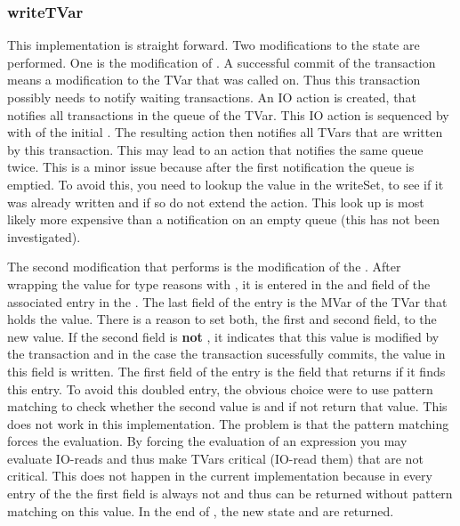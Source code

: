 \subsubsection{writeTVar}
This implementation is straight forward. Two modifications to the state are performed. One is
the modification of . A successful commit of the transaction means a 
modification to the TVar that  was called on. Thus this transaction 
possibly needs to notify waiting transactions. An IO action is created, that notifies
all transactions in the queue of the TVar. This IO action is sequenced by \code{>>} with 
 of the initial . The resulting action then notifies all
TVars that are written by this transaction. This may lead to an action that notifies the 
same queue twice. This is a minor issue because after the first notification the queue 
is emptied. To avoid this, you need to lookup the value in the writeSet, to see if 
it was already written and if so do not extend the  action. This look up
is most likely more expensive than a notification on an empty queue (this has not been 
investigated). 

The second modification that  performs is the modification of the .
After wrapping the value for type reasons with , it is entered in the  and  
field of the associated entry in the . The last field of the entry is the MVar of
the TVar that holds the value. There is a reason to set both, the first and second field, to the
new value. If the second field is \textbf{not} , it indicates that this value is modified 
by the transaction and in the case the transaction sucessfully commits, the value in this field
is written. The first field of the entry is the field that  returns if it finds
this entry. To avoid this doubled entry, the obvious choice were to use pattern matching to 
check whether the second value is  and if not return that value. This does not
work in this implementation. The problem is that the pattern matching forces the evaluation.
By forcing the evaluation of an expression you may evaluate IO-reads and thus make TVars critical (IO-read them)
that are not critical. This does not happen in the current implementation because in every entry
of the  the first field is always not  and thus can be returned
without pattern matching on this value. 
In the end of , the new state and \code{()} are returned.


